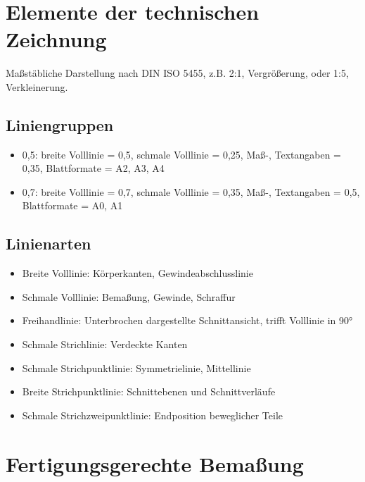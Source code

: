 \documentclass[a4paper,DIV=15,fontsize=11pt]{scrartcl}
\begin{document}
\section{Elemente der technischen Zeichnung}
Maßstäbliche Darstellung nach DIN ISO 5455, z.B. 2:1, Vergrößerung, oder 1:5, Verkleinerung.
	
\subsection{Liniengruppen}
\begin{itemize}
	\item 0,5: breite Volllinie = 0,5, schmale Volllinie = 0,25, Maß-, Textangaben = 0,35, Blattformate = A2, A3, A4
	\item 0,7: breite Volllinie = 0,7, schmale Volllinie = 0,35, Maß-, Textangaben = 0,5, Blattformate = A0, A1
\end{itemize}
	
\subsection{Linienarten}
\begin{itemize}
	\item Breite Volllinie: Körperkanten, Gewindeabschlusslinie
	\item Schmale Volllinie: Bemaßung, Gewinde, Schraffur
	\item Freihandlinie: Unterbrochen dargestellte Schnittansicht, trifft Volllinie in 90°
	\item Schmale Strichlinie: Verdeckte Kanten
	\item Schmale Strichpunktlinie: Symmetrielinie, Mittellinie
	\item Breite Strichpunktlinie: Schnittebenen und Schnittverläufe
	\item Schmale Strichzweipunktlinie: Endposition beweglicher Teile
\end{itemize}
	
\section{Fertigungsgerechte Bemaßung}
\end{document}
